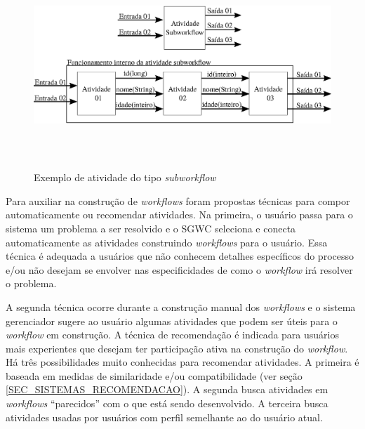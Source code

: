 \begin{figure}[!htp]
    \centering  
    \caption{Exemplo de atividade do tipo \emph{subworkflow}}
    \includegraphics[width=15cm,height=7cm]{./secoes/conceitosFundamentais/pics/img/Subworkflow.eps}    
	\label{figura_atividade_subworkflow}
	\vspace{0.1cm}
	\source{\varAutorData}
\end{figure}

Para auxiliar na construção de \emph{workflows} foram propostas técnicas para compor automaticamente ou recomendar atividades. Na primeira, o usuário passa para o sistema um problema a ser resolvido e o SGWC seleciona e conecta automaticamente as atividades construindo \emph{workflows} para o usuário. Essa técnica é adequada a usuários que não conhecem detalhes específicos do processo e/ou não desejam se envolver nas especificidades de como o \emph{workflow} irá resolver o problema. 

A segunda técnica ocorre durante a construção manual dos \emph{workflows} e o sistema gerenciador sugere ao usuário algumas atividades que podem ser úteis para o \emph{workflow} em construção. 
A técnica de recomendação é indicada para usuários mais experientes que desejam ter participação ativa na construção do \emph{workflow}.
Há três possibilidades muito conhecidas para recomendar atividades. A primeira é baseada em medidas de similaridade e/ou compatibilidade (ver seção \ref{SEC_SISTEMAS_RECOMENDACAO}). A segunda busca atividades em \emph{workflows} ``parecidos'' com o que está sendo desenvolvido. A terceira busca atividades usadas por usuários com perfil semelhante ao do usuário atual. 


